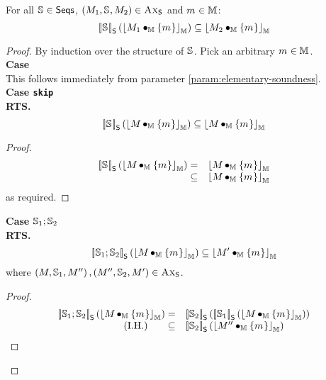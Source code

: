 \begin{lemma}\label{lem:seqSoundness}
For all $\mathbb{S}_{} \in \textsf{Seqs}$, $\left(M_{1}, \mathbb{S}_{}, M_{2}\right) \in \textsc{Ax}_{\textsf{S}}$ and $m_{} \in \mathbb{M}$:
%
\[
	\left[\!\left| \mathbb{S}_{} \right |\! \right]_{\textsf{S}}\left( \left\lfloor M_{1} \bullet_{\mathbb{M}} \{m_{}\} \right\rfloor_{\mathbb{M}} \right) \subseteq \left\lfloor M_{2} \bullet_{\mathbb{M}} \{m_{}\} \right\rfloor_{\mathbb{M}}
\]
%
\begin{proof}
By induction over the structure of $\mathbb{S}_{}$. Pick an arbitrary $m_{} \in \mathbb{M}$.\\

\noindent\textbf{Case \hspace*{0.3cm}}\bc{}\\
This follows immediately from parameter \ref{param:elementary-soundness}.\\


\noindent\textbf{Case \hspace*{0.3cm}\texttt{skip}}\\
\textbf{RTS.}
%
\[
	\left[\!\left| \mathbb{S}_{} \right |\! \right]_{\textsf{S}}\left( \left\lfloor M_{} \bullet_{\mathbb{M}} \{m_{}\} \right\rfloor_{\mathbb{M}} \right) 
	\subseteq \left\lfloor M_{} \bullet_{\mathbb{M}} \{m_{}\} \right\rfloor_{\mathbb{M}}
\]
%
\begin{proof}
%
\[
\begin{array}{r l}
	\left[\!\left| \mathbb{S}_{} \right |\! \right]_{\textsf{S}}\left( \left\lfloor M_{} \bullet_{\mathbb{M}} \{m_{}\} \right\rfloor_{\mathbb{M}} \right) 
	= &
	\left\lfloor M_{} \bullet_{\mathbb{M}} \{m_{}\} \right\rfloor_{\mathbb{M}}\\

	\subseteq & \left\lfloor M_{} \bullet_{\mathbb{M}} \{m_{}\} \right\rfloor_{\mathbb{M}}
\end{array}
\]
%
as required.
\renewcommand{\qed}{}
\end{proof}
%
%

\noindent\textbf{Case \hspace*{0.3cm}}$\mathbb{S}_{1} ; \mathbb{S}_{2}$\\
\textbf{RTS.}
%
\[
	\left[\!\left| \mathbb{S}_{1}; \mathbb{S}_{2} \right |\! \right]_{\textsf{S}}\left( \left\lfloor M_{} \bullet_{\mathbb{M}} \{m_{}\} \right\rfloor_{\mathbb{M}} \right) 
	\subseteq \left\lfloor M_{}' \bullet_{\mathbb{M}} \{m_{}\} \right\rfloor_{\mathbb{M}}
\]
%
where $\left(M_{}, \mathbb{S}_{1}, M_{}'' \right), \left(M_{}'', \mathbb{S}_{2}, M_{}' \right)  \in \textsc{Ax}_{\textsf{S}}$.
\begin{proof}
%
\[
\begin{array}{r l}
	
	\opSemSeq{\seq{1}; \seq{2}}{\reifyH{\Hp{} \composeH \{\h{}\}}} 
	= &  
	\opSemSeq{\seq{2}}{ \opSemSeq{\seq{1}}{\reifyH{\Hp{} \composeH \{\h{}\}}}}\\

	\text{(I.H.) \hspace*{0.5cm}}
	\subseteq &
	\opSemSeq{\seq{2}}{\reifyH{\Hp{}'' \composeH \{\h{}\}}}\\
	

\end{array}\]
\end{proof}
\end{proof}
\end{lemma}

